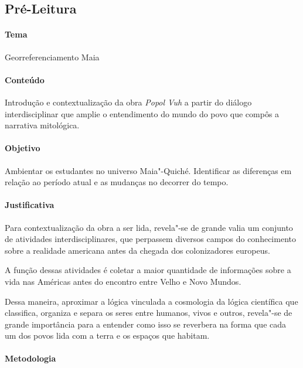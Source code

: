 \documentclass[12pt]{extarticle}
\begin{document}
\subsection{Pré-Leitura}

\paragraph{Tema} Georreferenciamento Maia

\paragraph{Conteúdo} Introdução e contextualização da obra \emph{Popol Vuh}
a partir do diálogo interdisciplinar que amplie o entendimento do mundo
do povo que compôs a narrativa mitológica.

\paragraph{Objetivo} Ambientar os estudantes no universo Maia"-Quiché.
Identificar as diferenças em relação ao período atual e as mudanças no decorrer
do tempo.

\paragraph{Justificativa} Para contextualização da obra a ser lida, revela"-se de 
grande valia um conjunto de atividades interdisciplinares, que perpassem diversos campos
do conhecimento sobre a realidade americana antes da chegada dos
colonizadores europeus. 

A função dessas atividades é coletar a maior
quantidade de informações sobre a vida nas Américas antes do encontro
entre Velho e Novo Mundos.

Dessa maneira, aproximar a lógica vinculada a cosmologia da lógica científica que classifica,
organiza e separa os seres entre humanos, vivos e outros, revela"-se de grande importância
para a entender como isso se reverbera na forma que cada um dos povos lida com a terra e os 
espaços que habitam. 

\paragraph{Metodologia} 
\end{document}
